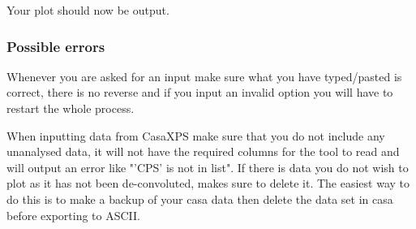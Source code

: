 \documentclass[10pt]{report}
\begin{document}
Your plot should now be output.

\subsubsection{Possible errors}

Whenever you are asked for an input make sure what you have typed/pasted is correct, there is no reverse and if you input an invalid option you will have to restart the whole process.

When inputting data from CasaXPS make sure that you do not include any unanalysed data, it will not have the required columns for the tool to read and will output an error like "'CPS' is not in list". If there is data you do not wish to plot as it has not been de-convoluted, makes sure to delete it. The easiest way to do this is to make a backup of your casa data then delete the data set in casa before exporting to ASCII.

\pagebreak
\end{document}
